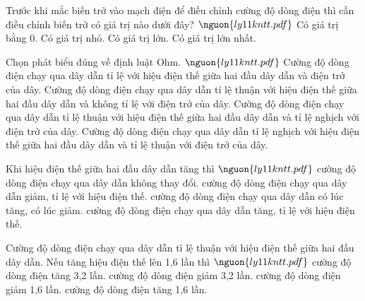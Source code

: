 \begin{ex}
Trước khi mắc biến trở vào mạch điện để điều chỉnh cường độ dòng điện thì cần điều chỉnh biến trở có giá trị nào dưới đây? $\nguon{ly11 kntt.pdf}$
\choice
{Có giá trị bằng 0.}
{Có giá trị nhỏ.}
{Có giá trị lớn.}
{\True Có giá trị lớn nhất.}
\end{ex}

\begin{ex}
Chọn phát biểu đúng về định luật Ohm. $\nguon{ly11 kntt.pdf}$
\choice
{Cường độ dòng điện chạy qua dây dẫn tỉ lệ với hiệu điện thế giữa hai đầu dây dẫn và điện trở của dây.}
{Cường độ dòng điện chạy qua dây dẫn tỉ lệ thuận với hiệu điện thế giữa hai đầu dây dẫn và không tỉ lệ với điện trở của dây.}
{\True Cường độ dòng điện chạy qua dây dẫn tỉ lệ thuận với hiệu điện thế giữa hai đầu dây dẫn và tỉ lệ nghịch với điện trở của dây.}
{Cường độ dòng điện chạy qua dây dẫn tỉ lệ nghịch với hiệu điện thế giữa hai đầu dây dẫn và tỉ lệ thuận với điện trở của dây.}
\end{ex}

\begin{ex}
Khi hiệu điện thế giữa hai đầu dây dẫn tăng thì $\nguon{ly11 kntt.pdf}$
\choice
{cường độ dòng điện chạy qua dây dẫn không thay đổi.}
{cường độ dòng điện chạy qua dây dẫn giảm, tỉ lệ với hiệu điện thế.}
{cường độ dòng điện chạy qua dây dẫn có lúc tăng, có lúc giảm.}
{\True cường độ dòng điện chạy qua dây dẫn tăng, tỉ lệ với hiệu điện thế.}
\end{ex}

\begin{ex}
Cường độ dòng điện chạy qua dây dẫn tỉ lệ thuận với hiệu điện thế giữa hai đầu dây dẫn. Nếu tăng hiệu điện thế lên 1,6 lần thì $\nguon{ly11 kntt.pdf}$
\choice
{cường độ dòng điện tăng 3,2 lần.}
{cường độ dòng điện giảm 3,2 lần.}
{cường độ dòng điện giảm 1,6 lần.}
{\True cường độ dòng điện tăng 1,6 lần.}
\end{ex}

